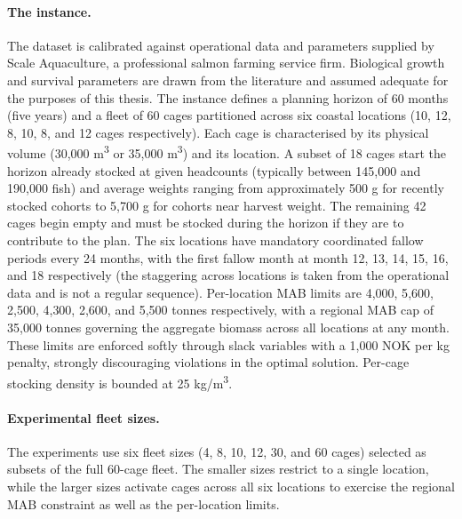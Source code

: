 \documentclass[12pt,a4paper]{article}
\begin{document}
\paragraph{The instance.}
The dataset is calibrated against operational data and parameters supplied
by Scale Aquaculture, a professional salmon farming service firm. Biological
growth and survival parameters are drawn from the literature and assumed
adequate for the purposes of this thesis. The instance defines a planning
horizon of 60 months (five years) and a fleet of 60 cages partitioned
across six coastal locations (10, 12, 8, 10, 8, and 12 cages
respectively). Each cage is characterised by its physical volume
(30{,}000 m\textsuperscript{3} or 35{,}000 m\textsuperscript{3}) and its
location. A subset of 18 cages start the horizon already stocked at given
headcounts (typically between 145{,}000 and 190{,}000 fish) and average
weights ranging from approximately 500 g for recently stocked cohorts to
5{,}700 g for cohorts near harvest weight. The remaining 42 cages begin
empty and must be stocked during the horizon if they are to contribute
to the plan. The six locations have mandatory coordinated fallow periods
every 24 months, with the first fallow month at month 12, 13, 14, 15,
16, and 18 respectively (the staggering across locations is taken from
the operational data and is not a regular sequence). Per-location MAB
limits are 4{,}000, 5{,}600, 2{,}500, 4{,}300, 2{,}600, and 5{,}500
tonnes respectively, with a regional MAB cap of 35{,}000 tonnes
governing the aggregate biomass across all locations at any month. These
limits are enforced softly through slack variables with a 1{,}000 NOK
per kg penalty, strongly discouraging violations in the
optimal solution. Per-cage stocking density is bounded at
25 kg/m\textsuperscript{3}.

\paragraph{Experimental fleet sizes.}
The experiments use six fleet sizes (4, 8, 10, 12, 30, and 60 cages) selected as subsets of the full 60-cage fleet. The smaller sizes restrict to a single location, while the larger sizes activate cages across all six locations to exercise the regional MAB constraint as well as the per-location limits.
\end{document}
